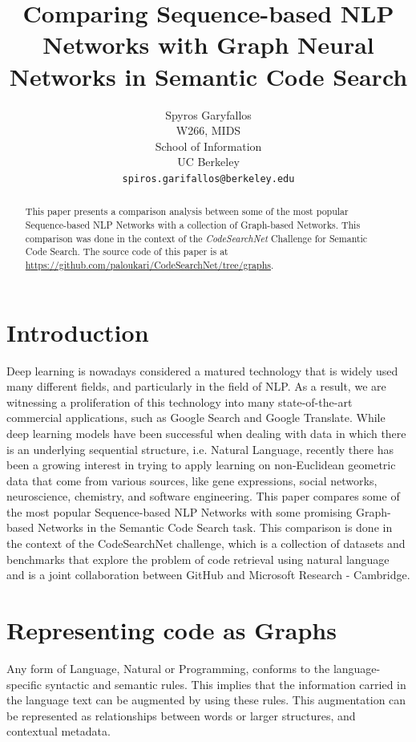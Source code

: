 \documentclass{article}
\title{Comparing Sequence-based NLP Networks with Graph Neural Networks in Semantic Code Search}
\author{
  Spyros Garyfallos\\
  W266, MIDS\\
  School of Information \\
  UC Berkeley\\
  \texttt{spiros.garifallos@berkeley.edu}
}
\begin{document}
\maketitle

\begin{abstract}
This paper presents a comparison analysis between some of the most popular Sequence-based NLP Networks with a collection of Graph-based Networks. This comparison was done in the context of the \emph{CodeSearchNet} \cite{1909.09436} Challenge for Semantic Code Search. The source code of this paper is at \url{https://github.com/paloukari/CodeSearchNet/tree/graphs}.
\end{abstract}




\section{Introduction}
Deep learning is nowadays considered a matured technology that is widely used many different fields, and particularly in the field of NLP. As a result, we are witnessing a proliferation of this technology into many state-of-the-art commercial applications, such as Google Search and Google Translate.
While deep learning models have been successful when dealing with data in which there is an underlying sequential structure, i.e. Natural Language, recently there has been a growing interest in trying to apply learning on non-Euclidean geometric data that come from various sources, like gene expressions, social networks, neuroscience, chemistry, and software engineering\cite{1611.08097}.
This paper compares some of the most popular Sequence-based NLP Networks with some promising Graph-based Networks in the Semantic Code Search task. This comparison is done in the context of the CodeSearchNet challenge, which is a collection of datasets and benchmarks that explore the problem of code retrieval using natural language and is a joint collaboration between GitHub and Microsoft Research - Cambridge\cite{1909.09436}.

\section{Representing code as Graphs}
Any form of Language, Natural or Programming, conforms to the language-specific syntactic and semantic rules. This implies that the information carried in the language text can be augmented by using these rules. This augmentation can be represented as relationships between words or larger structures, and contextual metadata\cite{1611.08097}.
\end{document}
